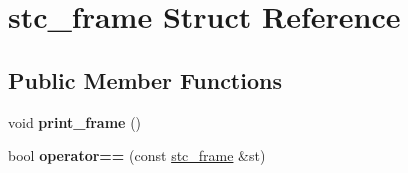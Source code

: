 \hypertarget{structstc__frame}{\section{stc\-\_\-frame Struct Reference}
\label{structstc__frame}
}
\subsection*{Public Member Functions}
\begin{DoxyCompactItemize}
\item 
\hypertarget{structstc__frame_aca7549c3afce65dadb2364be17e057cf}{void {\bfseries print\-\_\-frame} ()}\label{structstc__frame_aca7549c3afce65dadb2364be17e057cf}

\item 
\hypertarget{structstc__frame_a8c9f585c3f8dadaf0c4e3d0d06e84297}{bool {\bfseries operator==} (const \hyperlink{structstc__frame}{stc\-\_\-frame} \&st)}\label{structstc__frame_a8c9f585c3f8dadaf0c4e3d0d06e84297}

\end{DoxyCompactItemize}
